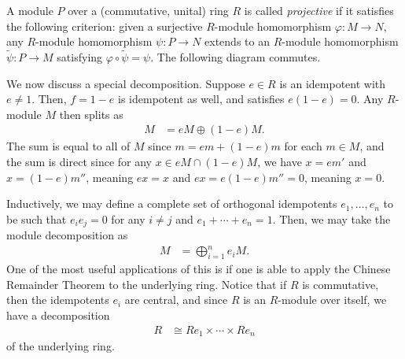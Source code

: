 \documentclass[10pt]{mypackage}
\begin{document}
\begin{definition}
A module $P$ over a (commutative, unital) ring $R$ is called \textit{projective} if it satisfies the following criterion: given a surjective $R$-module homomorphism $\varphi\colon M\rightarrow N$, any $R$-module homomorphism $\psi\colon P\rightarrow N$ extends to an $R$-module homomorphism $ \widetilde{\psi}\colon P\rightarrow M $ satisfying $\varphi\circ \widetilde{\psi} = \psi$. The following diagram commutes.
\begin{center}
\end{center}
\end{definition}
We now discuss a special decomposition. Suppose $e\in R$ is an idempotent with $e\neq 1$. Then, $f = 1-e$ is idempotent as well, and satisfies $e \left( 1-e \right) = 0$. Any $R$-module $M$ then splits as
\begin{align*}
  M &= eM \oplus \left( 1-e \right)M.
\end{align*}
The sum is equal to all of $M$ since $m = em + \left( 1-e \right)m$ for each $m\in M$, and the sum is direct since for any $x\in eM\cap \left( 1-e \right)M$, we have $x = em'$ and $x = \left( 1-e \right)m''$, meaning $ex = x$ and $ex = e\left( 1-e \right)m'' = 0$, meaning $x = 0$.

Inductively, we may define a complete set of orthogonal idempotents $e_1,\dots,e_n$ to be such that $e_ie_j = 0$ for any $i\neq j$ and $e_1 + \cdots + e_n = 1$. Then, we may take the module decomposition as
\begin{align*}
  M &= \bigoplus_{i=1}^{n} e_iM.
\end{align*}
One of the most useful applications of this is if one is able to apply the Chinese Remainder Theorem to the underlying ring. Notice that if $R$ is commutative, then the idempotents $e_i$ are central, and since $R$ is an $R$-module over itself, we have a decomposition
\begin{align*}
  R &\cong Re_1 \times \cdots \times Re_n
\end{align*}
of the underlying ring.
\end{document}
